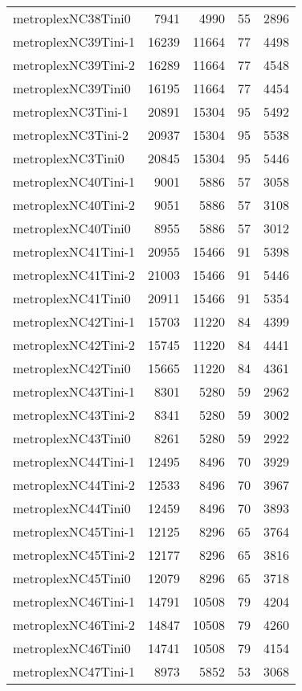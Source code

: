 \begin{tabular}{lrrrr}
metroplexNC38Tini0 & 7941 & 4990 & 55 & 2896 \\
metroplexNC39Tini-1 & 16239 & 11664 & 77 & 4498 \\
metroplexNC39Tini-2 & 16289 & 11664 & 77 & 4548 \\
metroplexNC39Tini0 & 16195 & 11664 & 77 & 4454 \\
metroplexNC3Tini-1 & 20891 & 15304 & 95 & 5492 \\
metroplexNC3Tini-2 & 20937 & 15304 & 95 & 5538 \\
metroplexNC3Tini0 & 20845 & 15304 & 95 & 5446 \\
metroplexNC40Tini-1 & 9001 & 5886 & 57 & 3058 \\
metroplexNC40Tini-2 & 9051 & 5886 & 57 & 3108 \\
metroplexNC40Tini0 & 8955 & 5886 & 57 & 3012 \\
metroplexNC41Tini-1 & 20955 & 15466 & 91 & 5398 \\
metroplexNC41Tini-2 & 21003 & 15466 & 91 & 5446 \\
metroplexNC41Tini0 & 20911 & 15466 & 91 & 5354 \\
metroplexNC42Tini-1 & 15703 & 11220 & 84 & 4399 \\
metroplexNC42Tini-2 & 15745 & 11220 & 84 & 4441 \\
metroplexNC42Tini0 & 15665 & 11220 & 84 & 4361 \\
metroplexNC43Tini-1 & 8301 & 5280 & 59 & 2962 \\
metroplexNC43Tini-2 & 8341 & 5280 & 59 & 3002 \\
metroplexNC43Tini0 & 8261 & 5280 & 59 & 2922 \\
metroplexNC44Tini-1 & 12495 & 8496 & 70 & 3929 \\
metroplexNC44Tini-2 & 12533 & 8496 & 70 & 3967 \\
metroplexNC44Tini0 & 12459 & 8496 & 70 & 3893 \\
metroplexNC45Tini-1 & 12125 & 8296 & 65 & 3764 \\
metroplexNC45Tini-2 & 12177 & 8296 & 65 & 3816 \\
metroplexNC45Tini0 & 12079 & 8296 & 65 & 3718 \\
metroplexNC46Tini-1 & 14791 & 10508 & 79 & 4204 \\
metroplexNC46Tini-2 & 14847 & 10508 & 79 & 4260 \\
metroplexNC46Tini0 & 14741 & 10508 & 79 & 4154 \\
metroplexNC47Tini-1 & 8973 & 5852 & 53 & 3068 \\

\end{tabular}
